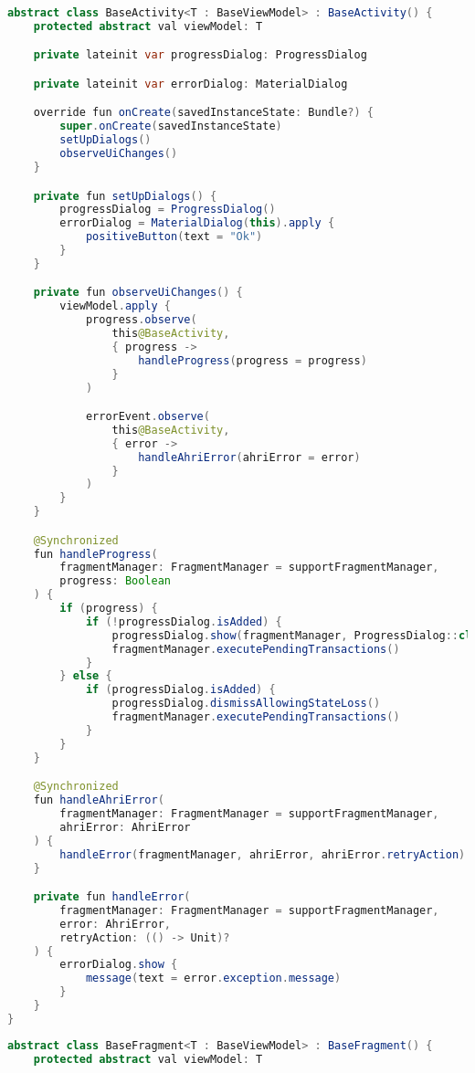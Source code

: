 \begin{asection}

\setlength{\parindent}{0ex}
\begin{lstlisting}[language=Java,label={lst:add:a_1}, caption={BaseActivity}]
abstract class BaseActivity<T : BaseViewModel> : BaseActivity() {
    protected abstract val viewModel: T

    private lateinit var progressDialog: ProgressDialog

    private lateinit var errorDialog: MaterialDialog

    override fun onCreate(savedInstanceState: Bundle?) {
        super.onCreate(savedInstanceState)
        setUpDialogs()
        observeUiChanges()
    }

    private fun setUpDialogs() {
        progressDialog = ProgressDialog()
        errorDialog = MaterialDialog(this).apply {
            positiveButton(text = "Ok")
        }
    }

    private fun observeUiChanges() {
        viewModel.apply {
            progress.observe(
                this@BaseActivity,
                { progress ->
                    handleProgress(progress = progress)
                }
            )

            errorEvent.observe(
                this@BaseActivity,
                { error ->
                    handleAhriError(ahriError = error)
                }
            )
        }
    }

    @Synchronized
    fun handleProgress(
        fragmentManager: FragmentManager = supportFragmentManager,
        progress: Boolean
    ) {
        if (progress) {
            if (!progressDialog.isAdded) {
                progressDialog.show(fragmentManager, ProgressDialog::class.java.canonicalName)
                fragmentManager.executePendingTransactions()
            }
        } else {
            if (progressDialog.isAdded) {
                progressDialog.dismissAllowingStateLoss()
                fragmentManager.executePendingTransactions()
            }
        }
    }

    @Synchronized
    fun handleAhriError(
        fragmentManager: FragmentManager = supportFragmentManager,
        ahriError: AhriError
    ) {
        handleError(fragmentManager, ahriError, ahriError.retryAction)
    }

    private fun handleError(
        fragmentManager: FragmentManager = supportFragmentManager,
        error: AhriError,
        retryAction: (() -> Unit)?
    ) {
        errorDialog.show {
            message(text = error.exception.message)
        }
    }
}
\end{lstlisting}
\begin{lstlisting}[language=Java,label={lst:add:a_2}, caption={BaseFragment}]
abstract class BaseFragment<T : BaseViewModel> : BaseFragment() {
    protected abstract val viewModel: T


\end{lstlisting}
\end{asection}
